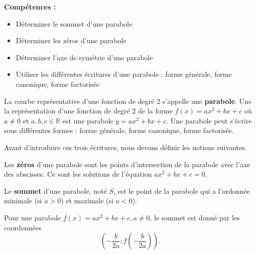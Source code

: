 \documentclass[a4paper,12pt]{report}
\begin{document}
{\bfseries Compétences :}
\begin{itemize}
	\item Déterminer le sommet d'une parabole
	\item Déterminer les zéros d'une parabole
	\item Déterminer l'axe de symétrie d'une parabole
	\item Utiliser les différentes écritures d'une parabole : forme générale, forme canonique, forme factorisée
\end{itemize}

\begin{defi}[parabole]
La courbe représentative d'une fonction de degré 2 s'appelle une {\bfseries parabole}. Une la représentation d'une fonction de degré 2 de la forme $f(x)=ax^2+bx+c$ où $a\neq 0$ et $a,b,c\in \mathbb{R}$ est une parabole $y=ax^2+bx+c$. Une parabole peut s'écrire sous différentes formes : forme générale, forme canonique, forme factorisée.
\end{defi}

Avant d'introduire ces trois écritures, nous devons définir les notions suivantes. 

\begin{defi}[zéros]
	Les {\bfseries zéros} d'une parabole sont les points d'intersection de la parabole avec l'axe des abscisses. Ce sont les solutions de l'équation $ax^2+bx+c=0$.
\end{defi}

\begin{defi}[sommet]
	Le {\bfseries sommet} d'une parabole, noté $S$, est le point de la parabole qui a l'ordonnée minimale (si $a>0$) et maximale (si $a<0$).
\end{defi}
   
\begin{rem}
Pour une parabole $f(x)=ax^2+bx+c, a\neq 0$, le sommet est donné par les coordonnées 
\[\left(-\dfrac{b}{2a};f\left(-\dfrac{b}{2a}\right)\right).\]
\end{rem}
\end{document}
